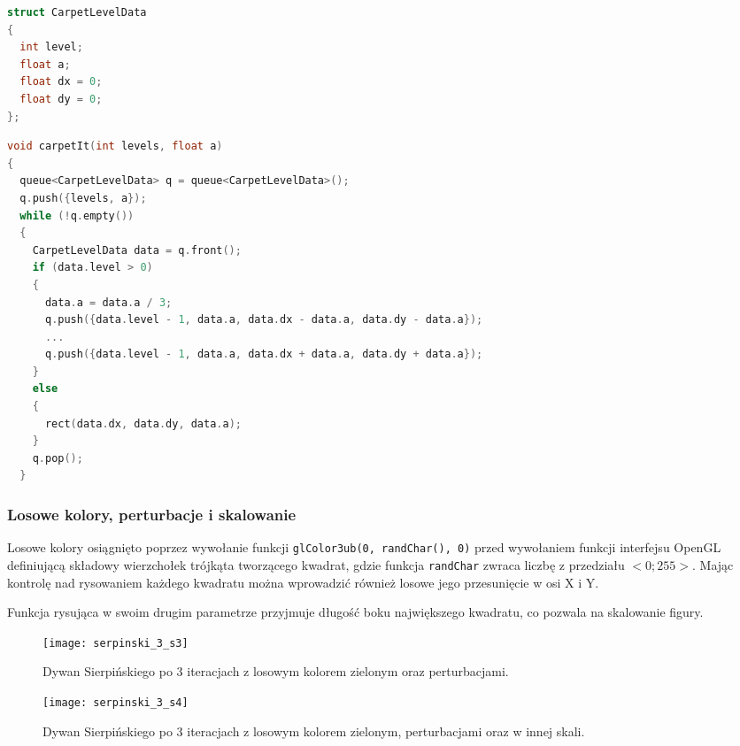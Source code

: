 \begin{lstlisting}[language=C++, caption=Struktura danych przechowująca aktualny stan rysowania.]
struct CarpetLevelData
{
  int level;
  float a;
  float dx = 0;
  float dy = 0;
};
\end{lstlisting}


\begin{lstlisting}[language=C++, caption=Funkcja rysująca dywan Sierpińskiego iteracyjnie. Pominięto niektóre wywołania.]
void carpetIt(int levels, float a)
{
  queue<CarpetLevelData> q = queue<CarpetLevelData>();
  q.push({levels, a});
  while (!q.empty())
  {
    CarpetLevelData data = q.front();
    if (data.level > 0)
    {
      data.a = data.a / 3;
      q.push({data.level - 1, data.a, data.dx - data.a, data.dy - data.a});
      ...
      q.push({data.level - 1, data.a, data.dx + data.a, data.dy + data.a});
    }
    else
    {
      rect(data.dx, data.dy, data.a);
    }
    q.pop();
  }
\end{lstlisting}

\subsubsection{Losowe kolory, perturbacje i skalowanie}
Losowe kolory osiągnięto poprzez wywołanie funkcji \lstinline{glColor3ub(0, randChar(), 0)} przed wywołaniem funkcji interfejsu OpenGL definiującą składowy wierzchołek trójkąta tworzącego kwadrat, gdzie funkcja \lstinline{randChar} zwraca liczbę z przedziału $<0;255>$. Mając kontrolę nad rysowaniem każdego kwadratu można wprowadzić również losowe jego przesunięcie w osi X i Y.

Funkcja rysująca w swoim drugim parametrze przyjmuje długość boku największego kwadratu, co pozwala na skalowanie figury.


\begin{figure}[H]
  \begin{minipage}[t]{.45\linewidth}
  \texttt{[image: serpinski\_3\_s3]}
      \caption{Dywan Sierpińskiego po 3 iteracjach z losowym kolorem zielonym oraz perturbacjami.}
    \end{minipage}
  \hspace{.05\linewidth}
  \begin{minipage}[t]{0.45\linewidth}
      \texttt{[image: serpinski\_3\_s4]}
      \caption{Dywan Sierpińskiego po 3 iteracjach z losowym kolorem zielonym, perturbacjami oraz w innej skali.}
    \end{minipage}
\end{figure}